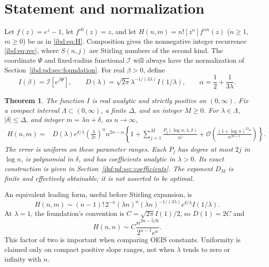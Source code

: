 \documentclass[11pt,letterpaper]{article}
\newtheorem{theorem}{Theorem}[section]
\theoremstyle{remark}\newtheorem{remark}[theorem]{Remark}
\newcommand{\I}{\mathcal I}
\newcommand{\Oh}{\mathcal O}
\begin{document}
\section{Statement and normalization}\label{ibd:pd:sec:statement}
Let $f(z)=e^z-1$, let $f^{\circ0}(z)=z$, and let $H(n,m)=n![z^n]f^{\circ m}(z)$ ($n\geq1$, $m\geq0$) be as in \eqref{ibd:eq:H}. Composition gives the nonnegative integer recurrence \eqref{ibd:eq:rec}, where $S(n,j)$ are Stirling numbers of the second kind. The coordinate $\Psi$ and fixed-radius functional $\I$ will always have the normalization of Section~\ref{ibd:pd:sec:foundation}. For real $\beta>0$, define
\begin{equation}\label{ibd:pd:eq:amplitude}
 I(\beta)=\I[e^{\beta\Psi}],\qquad
 D(\lambda)=\sqrt{2\pi}\lambda^{-1/(3\lambda)}I(1/\lambda),\qquad
 \alpha=\frac12+\frac1{3\lambda}.
\end{equation}
\begin{theorem}\label{ibd:pd:thm:main}
The function $I$ is real analytic and strictly positive on $(0,\infty)$. Fix a compact interval $\Lambda\subset(0,\infty)$, a finite $\Delta$, and an integer $M\geq0$. For $\lambda\in\Lambda$, $|\delta|\leq\Delta$, and integer $m=\lambda n+\delta$, as $n\to\infty$,
\begin{align}\label{ibd:pd:eq:main}
 H(n,m)={}&D(\lambda)e^{\delta/\lambda}
 \left(\frac{\lambda}{2e}\right)^n n^{2n-\alpha}
 \left\{1+\sum_{j=1}^M\frac{P_j(\log n;\lambda,\delta)}{n^j}
 +\Oh\!\left(\frac{(1+\log n)^{D_M}}{n^{M+1}}\right)\right\}.
\end{align}
The error is uniform on these parameter ranges. Each $P_j$ has degree at most $2j$ in $\log n$, is polynomial in $\delta$, and has coefficients analytic in $\lambda>0$. Its exact construction is given in Section~\ref{ibd:pd:sec:coefficients}. The exponent $D_M$ is finite and effectively obtainable; it is not asserted to be optimal.
\end{theorem}
An equivalent leading form, useful before Stirling expansion, is
\begin{equation}\label{ibd:pd:eq:factorial}
 H(n,m)\sim(n-1)!\,2^{-n}(\lambda n)^n
 (\lambda n)^{-1/(3\lambda)}e^{\delta/\lambda}I(1/\lambda).
\end{equation}
At $\lambda=1$, the foundation's convention is
$C=\sqrt{2\pi}I(1)/2$, so $D(1)=2C$ and
\[
 H(n,n)\sim C\frac{n^{2n-5/6}}{2^{n-1}e^n}.
\]
This factor of two is important when comparing OEIS constants. Uniformity is claimed only on compact positive slope ranges, not when $\lambda$ tends to zero or infinity with $n$.
\end{document}
